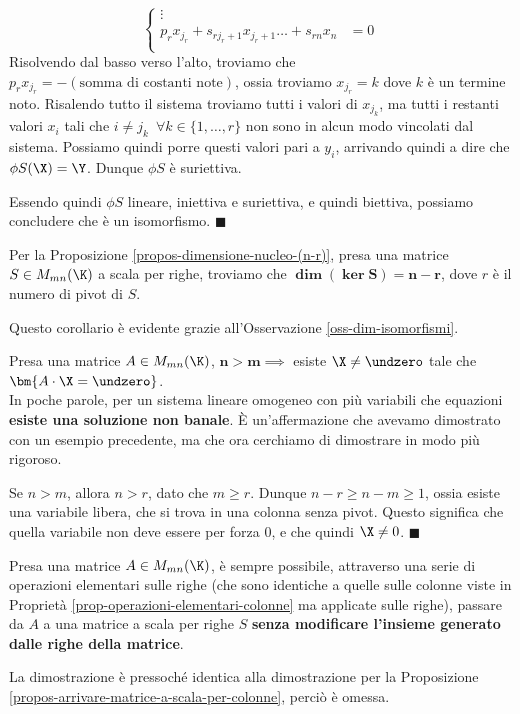 \documentclass[11pt, a4paper, titlepage, oneside]{scrbook}
\begin{document}
\begin{itemize}
\[\begin{cases}
    \vdots \\
    p_r x_{j_r} + s_{r j_r + 1} x_{j_r + 1} \ldots + s_{rn} x_n &= 0 \\
    \end{cases}
    \]
    Risolvendo dal basso verso l'alto, troviamo che $p_r x_{j_r} = -(\text{somma di costanti note})$, ossia troviamo $x_{j_r} = k$ dove $k$ è un termine noto. Risalendo tutto il sistema troviamo tutti i valori di $x_{j_k}$, ma tutti i restanti valori $x_i$ tali che $i \neq j_k \enspace \forall k \in \{1, \ldots, r\}$ non sono in alcun modo vincolati dal sistema. Possiamo quindi porre questi valori pari a $y_i$, arrivando quindi a dire che $\phi S(\X) = \Y$. Dunque $\phi S$ è suriettiva. 
\end{itemize}
Essendo quindi $\phi S$ lineare, iniettiva e suriettiva, e quindi biettiva, possiamo concludere che è un isomorfismo. $\blacksquare$

\begin{Proposizione}[Corollario]
\label{corol-propos-dimensione-nucleo}
Per la Proposizione \ref{propos-dimensione-nucleo-(n-r)}, presa una matrice $S \in M_{mn}(\K)$ a scala per righe, troviamo che $\bm{\dim (\ker S) = n -r}$, dove $r$ è il numero di pivot di $S$.
\end{Proposizione}

Questo corollario è evidente grazie all'Osservazione \ref{oss-dim-isomorfismi}.

\begin{Osservazione}[]
\label{oss-soluzione-non-banale-sistema}
Presa una matrice $A \in M_{mn}(\K)$, $\bm{n > m} \implies $ esiste $\X \neq \undzero$ tale che $\bm{A \cdot \X = \undzero}$. \\
In poche parole, per un sistema lineare omogeneo con più variabili che equazioni \textbf{esiste una soluzione non banale}. È un'affermazione che avevamo dimostrato con un esempio precedente, ma che ora cerchiamo di dimostrare in modo più rigoroso.
\end{Osservazione}

\Dimostrazione \nopagebreak

Se $n > m$, allora $n > r$, dato che $m \geq r$. Dunque $n-r \geq n- m \geq 1$, ossia esiste una variabile libera, che si trova in una colonna senza pivot. Questo significa che quella variabile non deve essere per forza $0$, e che quindi $\X \neq 0$. $\blacksquare$

\begin{Proposizione}[]
\label{propos-arrivare-matrice-a-scala-per-righe}
Presa una matrice $A \in M_{mn}(\K)$, è sempre possibile, attraverso una serie di operazioni elementari sulle righe (che sono identiche a quelle sulle colonne viste in Proprietà \ref{prop-operazioni-elementari-colonne} ma applicate sulle righe), passare da $A$ a una matrice a scala per righe $S$ \textbf{senza modificare l'insieme generato dalle righe della matrice}.
\end{Proposizione}
La dimostrazione è pressoché identica alla dimostrazione per la Proposizione \ref{propos-arrivare-matrice-a-scala-per-colonne}, perciò è omessa.
\end{document}
